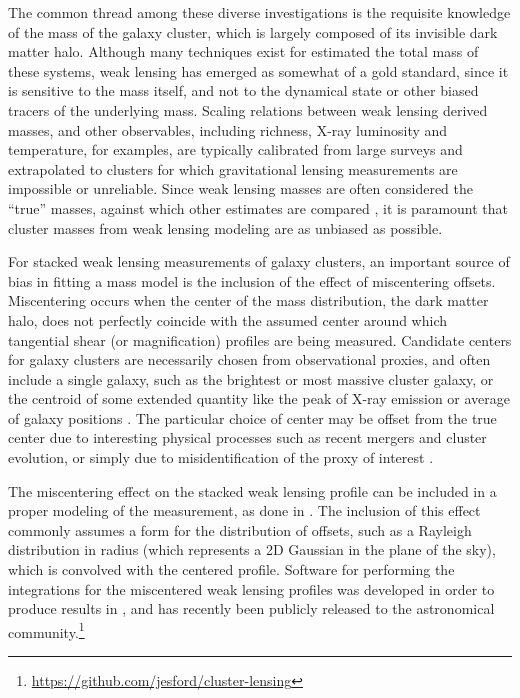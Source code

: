 \documentclass{emulateapj}
\begin{document}
The common thread among these diverse investigations is the requisite knowledge of the mass of the galaxy cluster, which is largely composed of its invisible dark matter halo. Although many techniques exist for estimated the total mass of these systems, weak lensing has emerged as somewhat of a gold standard, since it is sensitive to the mass itself, and not to the dynamical state or other biased tracers of the underlying mass. Scaling relations between weak lensing derived masses, and other observables, including richness, X-ray luminosity and temperature, for examples, are typically calibrated from large surveys and extrapolated to clusters for which gravitational lensing measurements are impossible or unreliable. Since weak lensing masses are often considered the ``true'' masses, against which other estimates are compared \citep[e.g.][]{Leauthaud10, vonderLinden14, Hoekstra15}, it is paramount that cluster masses from weak lensing modeling are as unbiased as possible.

For stacked weak lensing measurements of galaxy clusters, an important source of bias in fitting a mass model is the inclusion of the effect of miscentering offsets. Miscentering occurs when the center of the mass distribution, the dark matter halo, does not perfectly coincide with the assumed center around which tangential shear (or magnification) profiles are being measured. Candidate centers for galaxy clusters are necessarily chosen from observational proxies, and often include a single galaxy, such as the brightest or most massive cluster galaxy, or the centroid of some extended quantity like the peak of X-ray emission or average of galaxy positions \citep{George12}. The particular choice of center may be offset from the true center due to interesting physical processes such as recent mergers and cluster evolution, or simply due to misidentification of the proxy of interest \citep{Johnston07}. 

The miscentering effect on the stacked weak lensing profile can be included in a proper modeling of the measurement, as done in \citet{Johnston07, Mandelbaum10, Oguri11, George12, Sehgal13, Oguri14, Ford14, Ford15, Simet16}. The inclusion of this effect commonly assumes a form for the distribution of offsets, such as a Rayleigh distribution in radius (which represents a 2D Gaussian in the plane of the sky), which is convolved with the centered profile. Software for performing the integrations for the miscentered weak lensing profiles was developed in order to produce results in \citet{Ford14, Ford15}, and has recently been publicly released to the astronomical community.\footnote{\url{https://github.com/jesford/cluster-lensing}}
\end{document}
